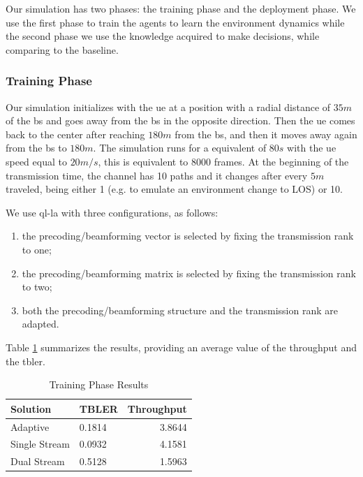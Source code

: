 Our simulation has two phases: the training phase and the deployment phase. We use the first phase to train the agents to learn the environment dynamics while the second phase we use the knowledge acquired to make decisions, while comparing to the baseline.

\subsubsection{Training Phase}
%

Our simulation initializes with the \gls{ue} at a position with a radial distance of $35m$ of the \gls{bs} and goes away from the \gls{bs} in the opposite direction.
%
Then the \gls{ue} comes back to the center after reaching $180m$ from the \gls{bs}, and then it moves away again from the \gls{bs} to $180m$.
%
The simulation runs for a equivalent of $80s$ with the \gls{ue} speed equal to $20m/s$, this is equivalent to 8000 frames.
%
At the beginning of the transmission time, the channel has 10 paths and it changes after every $5m$ traveled, being either 1 (e.g. to emulate an environment change to LOS) or 10.

%
We use \gls{ql-la} with three configurations, as follows:
\begin{enumerate}
    \item the precoding/beamforming vector is selected by fixing the transmission rank to one;
    \item the precoding/beamforming matrix is selected by fixing the transmission rank to two;
    \item both the precoding/beamforming structure and the transmission rank are adapted.
\end{enumerate}
%
Table \ref{tab:la-train-results} summarizes the results, providing  an average value of the throughput  and the \gls{tbler}.
%
\begin{table}[!htb]
	\centering
	\caption{Training Phase Results}
	\label{tab:la-train-results}
	\begin{tabularx}{0.6\columnwidth}{X X r}
		\toprule
		Solution        &   TBLER   & Throughput    \\
		\midrule
		Adaptive        &   0.1814  & 3.8644        \\
		Single Stream   &   0.0932  & 4.1581        \\
		Dual Stream     &   0.5128  & 1.5963        \\
		\bottomrule
	\end{tabularx}
\end{table}

